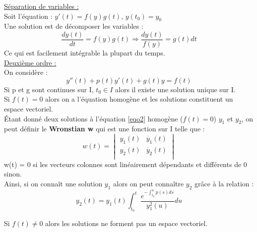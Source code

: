 \documentclass[../main.tex]{subfiles}
\begin{document}
\quad \underline{Séparation de variables :}\\
Soit l'équation : $y'(t) = f(y) g(t)$, $y(t_0) = y_0$\\
Une solution est de décomposer les variables :\\
\begin{equation}
    \frac{dy(t)}{dt} = f(y) g(t) \Rightarrow \frac{dy(t)}{f(y)} = g(t) dt
\end{equation}
Ce qui est facilement intégrable la plupart du temps.\\

\quad \underline{Deuxième ordre :}\\
On considère :\\
\begin{equation}
    y''(t) +p(t) y'(t) +g(t)y=f(t)
    \label{eqo2}
\end{equation}
Si p et g sont continues sur I, $t_0\in I$ alors il existe une solution unique sur I.\\

Si $f(t) =0$ alors on a l'équation homogène et les solutions constituent un espace vectoriel.\\

Étant donné deux solutions à l'équation \eqref{eqo2} homogène ($f(t) =0$) $y_1$ et $y_2$, on peut définir le \textbf{Wronstian w} qui est une fonction sur I telle que :\\
\begin{equation}
    w(t) = \begin{vmatrix}
        y_1(t) & \dot{y_1}(t)\\
        y_2(t) & \dot{y_2}(t)\\
    \end{vmatrix}
\end{equation}
w(t) = 0 si les vecteurs colonnes sont linéairement dépendants et différents de 0 sinon.\\

Ainsi, si on connaît une solution $y_1$ alors on peut connaître $y_2$ grâce à la relation :\\
\begin{equation}
    y_2(t) = y_1(t) \int_{t_0}^t \frac{e^{-\int_{t_0}^u p(s)ds}}{y_1^2(u)}du
\end{equation}

\warning Si $f(t) \neq 0$ alors les solutions ne forment pas un espace vectoriel.\\
\end{document}
